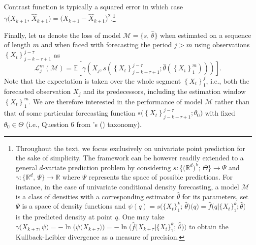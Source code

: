 \documentclass[11pt,dvipsnames]{article}
\newcommand{\possessivecite}[1]{\citeauthor{#1}'s (\citeyear{#1})}
\begin{document}
Contrast function is typically a squared error in which case $ \gamma\big(X_{k+1},\, \widehat{X}_{k+1}\big)=\big( X_{k+1} - \widehat{X}_{k+1} \big)^{2} $.\footnote{
  Throughout the text, we focus exclusively on univariate point prediction for the sake of simplicity. 
  The framework can be however readily extended to a general $d$-variate prediction problem by considering $ s:\lbrace \big( \mathbb{R}^{d}\big)^{k};\, \Theta \rbrace \rightarrow \Psi $ and $ \gamma: \lbrace  \mathbb{R}^{d},\, \Psi \rbrace  \rightarrow \mathbb{R}$ where $ \Psi $ represents the space of possible predictions. 
  For instance, in the case of univariate conditional density forecasting, a model $ \mathcal{M} $ is a class of densities with a corresponding estimator $ \widehat{\theta} $ for its parameters, set $ \Psi $ is a space of density functions and  $ \psi(q) = s\big( \lbrace X_{t} \rbrace_{1}^{k};\, \widehat{\theta}\big) \big( q\big)  = \widehat{f}\big( q| \lbrace X_{t} \rbrace_{1}^{k}; \widehat{\theta} \big)$ is the predicted density at point $ q $.
  One may take $ \gamma\big(X_{k+\tau}, \psi\big) = -\ln\big(\psi\big( X_{k+\tau}\big) \big) = -\ln\big( \widehat{f}\big( X_{k+\tau}| \lbrace X_{t} \rbrace_{1}^{k};\, \widehat{\theta} \big) \big)$ to obtain the Kullback-Leibler divergence \citep{kullbackInformationSufficiency1951} as a measure of precision.
}

Finally, let us denote the loss of model $ \mathcal{M}=\lbrace s,\, \widehat{\theta} \rbrace $ when estimated on a sequence of length $ m $ and when faced with forecasting the period $ j>m $  using observations $ \left\lbrace X_{t} \right\rbrace_{j-k-\tau+1}^{j-\tau} $ as
\begin{equation}
\mathcal{L}_{j}^{m}\left(\mathcal{M} \right)=\mathbb{E}\left[ \gamma\left( X_{j}, s\left(\left\lbrace X_{t} \right\rbrace_{j-k-\tau+1}^{j-\tau}; \widehat{\theta}\left(  \left\lbrace X_{t} \right\rbrace_{1}^{m} \right)\right)   \right) \right]. 
\end{equation}
Note that the expectation is taken over the whole segment $ \left\lbrace X_{t} \right\rbrace_{1}^{j} $, i.e., both the forecasted observation $ X_{j} $ and its predecessors, including the estimation window $ \left\lbrace X_{t} \right\rbrace_{1}^{m} $. We are therefore interested in the performance of model $ \mathcal{M} $ rather than that of some particular forecasting function $ s\big(\left\lbrace X_{t} \right\rbrace_{j-k-\tau+1}^{j-\tau}; \theta_{0}\big) $ with fixed $ \theta_{0} \in \Theta $ (i.e., Question 6 from \possessivecite{dietterichApproximateStatisticalTests1998} taxonomy). 
\end{document}
